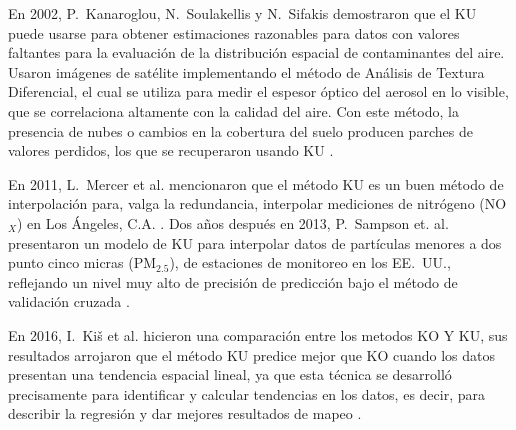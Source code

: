 En 2002, P.\ Kanaroglou, N.\ Soulakellis y N.\ Sifakis demostraron que el KU puede usarse para obtener estimaciones razonables para datos con valores faltantes para la evaluación de la distribución espacial de contaminantes del aire. Usaron imágenes de satélite implementando el método de Análisis de Textura Diferencial, el cual se utiliza para medir el espesor óptico del aerosol en lo visible, que se correlaciona altamente con la calidad del aire. Con este método, la presencia de nubes o cambios en la cobertura del suelo producen parches de valores perdidos, los que se recuperaron usando KU \citep{kanaroglou}.

En 2011, L.\ Mercer et al. mencionaron que el método KU es un buen método de interpolación para, valga la redundancia, interpolar mediciones de nitrógeno (NO$_{X}$) en Los Ángeles, C.A. \citep{mercer}. Dos años después en 2013, P.\ Sampson et. al. presentaron un modelo de KU para interpolar datos de partículas menores a dos punto cinco micras (PM$_{2.5}$), de estaciones de monitoreo en los EE.\ UU., reflejando un nivel muy alto de precisión de predicción bajo el método de validación cruzada \citep{sampson}.

En 2016, I.\ Ki\v{s} et al. hicieron una comparación entre los metodos KO Y KU, sus resultados arrojaron que el método KU predice mejor que KO cuando los datos presentan una tendencia espacial lineal, ya que esta técnica se desarrolló precisamente para identificar y calcular tendencias en los datos, es decir, para describir la regresión y dar mejores resultados de mapeo \citep{kivs}.  







































